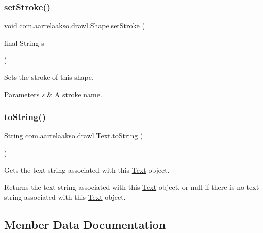 \subsubsection{\texorpdfstring{set\+Stroke()}{setStroke()}}
{\footnotesize\ttfamily void com.\+aarrelaakso.\+drawl.\+Shape.\+set\+Stroke (\begin{DoxyParamCaption}\item[{final String}]{s }\end{DoxyParamCaption})\hspace{0.3cm}{\ttfamily [inherited]}}



Sets the stroke of this shape. 


\begin{DoxyParams}{Parameters}
{\em s} & A stroke name. \\
\hline
\end{DoxyParams}
\mbox{\label{classcom_1_1aarrelaakso_1_1drawl_1_1_text_aaded65428b035e05b91e65f21808b434}} 
\subsubsection{\texorpdfstring{to\+String()}{toString()}}
{\footnotesize\ttfamily String com.\+aarrelaakso.\+drawl.\+Text.\+to\+String (\begin{DoxyParamCaption}{ }\end{DoxyParamCaption})}



Gets the text string associated with this \hyperlink{classcom_1_1aarrelaakso_1_1drawl_1_1_text}{Text} object. 

\begin{DoxyReturn}{Returns}
the text string associated with this \hyperlink{classcom_1_1aarrelaakso_1_1drawl_1_1_text}{Text} object, or {\ttfamily null} if there is no text string associated with this \hyperlink{classcom_1_1aarrelaakso_1_1drawl_1_1_text}{Text} object. 
\end{DoxyReturn}


\subsection{Member Data Documentation}
\mbox{\label{classcom_1_1aarrelaakso_1_1drawl_1_1_text_a94bf15b06c72349f5d5a1bfc56496685}} 
